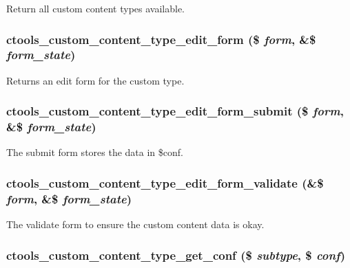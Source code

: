 \label{custom_8inc_a111ca5230b3530b710edb9b22f44ecaf}
Return all custom content types available. \hypertarget{custom_8inc_a4a0252b57ca4e1c004d40f421749f3ad}{
\subsubsection[{ctools\_\-custom\_\-content\_\-type\_\-edit\_\-form}]{\setlength{\rightskip}{0pt plus 5cm}ctools\_\-custom\_\-content\_\-type\_\-edit\_\-form (\$ {\em form}, \/  \&\$ {\em form\_\-state})}}
\label{custom_8inc_a4a0252b57ca4e1c004d40f421749f3ad}
Returns an edit form for the custom type. \hypertarget{custom_8inc_ad0a83093c506bb38b3acd0175ba46e51}{
\subsubsection[{ctools\_\-custom\_\-content\_\-type\_\-edit\_\-form\_\-submit}]{\setlength{\rightskip}{0pt plus 5cm}ctools\_\-custom\_\-content\_\-type\_\-edit\_\-form\_\-submit (\$ {\em form}, \/  \&\$ {\em form\_\-state})}}
\label{custom_8inc_ad0a83093c506bb38b3acd0175ba46e51}
The submit form stores the data in \$conf. \hypertarget{custom_8inc_a3f4656be834b0b67b500cd4336a5c54a}{
\subsubsection[{ctools\_\-custom\_\-content\_\-type\_\-edit\_\-form\_\-validate}]{\setlength{\rightskip}{0pt plus 5cm}ctools\_\-custom\_\-content\_\-type\_\-edit\_\-form\_\-validate (\&\$ {\em form}, \/  \&\$ {\em form\_\-state})}}
\label{custom_8inc_a3f4656be834b0b67b500cd4336a5c54a}
The validate form to ensure the custom content data is okay. \hypertarget{custom_8inc_ae59d8ddc790a2cf617a5258605558afe}{
\subsubsection[{ctools\_\-custom\_\-content\_\-type\_\-get\_\-conf}]{\setlength{\rightskip}{0pt plus 5cm}ctools\_\-custom\_\-content\_\-type\_\-get\_\-conf (\$ {\em subtype}, \/  \$ {\em conf})}}
